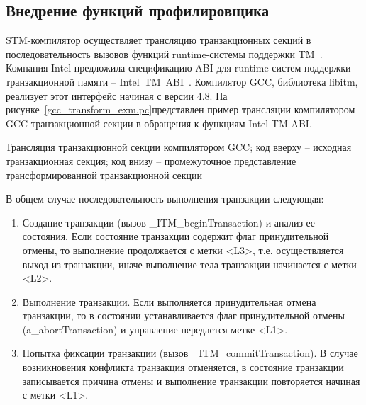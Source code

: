 \todo {
}

\subsection{Внедрение функций профилировщика}
STM-компилятор осуществляет трансляцию транзакционных секций в последовательность вызовов функций runtime-системы поддержки TM~\cite{olszewski_cutler_judostm}. Компания Intel предложила спецификацию ABI для runtime-систем поддержки транзакционной памяти -- Intel~TM~ABI~\cite{intel_tm_abi}. Компилятор GCC, библиотека libitm, реализует этот интерфейс начиная с версии 4.8. На рисунке~\ref{gcc_transform_exm.pc}представлен пример трансляции компилятором GCC транзакционной секции в обращения к функциям Intel TM ABI.


\begin{ListingEnv}[!h]
  
  
    \caption{Трансляция транзакционной секции компилятором GCC; код вверху -- исходная транзакционная секция; код внизу -- промежуточное представление трансформированной транзакционной секции}
    \label{list:gcc_transform_exm.pc}
\end{ListingEnv}

В общем случае последовательность выполнения транзакции следующая:
\begin{enumerate}
\item Создание транзакции (вызов \_ITM\_beginTransaction) и анализ ее состояния. Если состояние транзакции содержит флаг принудительной отмены, то выполнение продолжается с метки <L3>, т.е. осуществляется выход из транзакции, иначе выполнение тела транзакции начинается с метки <L2>.
\item  Выполнение транзакции. Если выполняется принудительная отмена транзакции, то в состоянии устанавливается флаг принудительной отмены (a\_abortTransaction) и управление передается метке <L1>.
\item Попытка фиксации транзакции (вызов \_ITM\_commitTransaction). В случае возникновения конфликта транзакция отменяется, в состояние транзакции записывается причина отмены и выполнение транзакции повторяется начиная с метки <L1>.
\end{enumerate}

